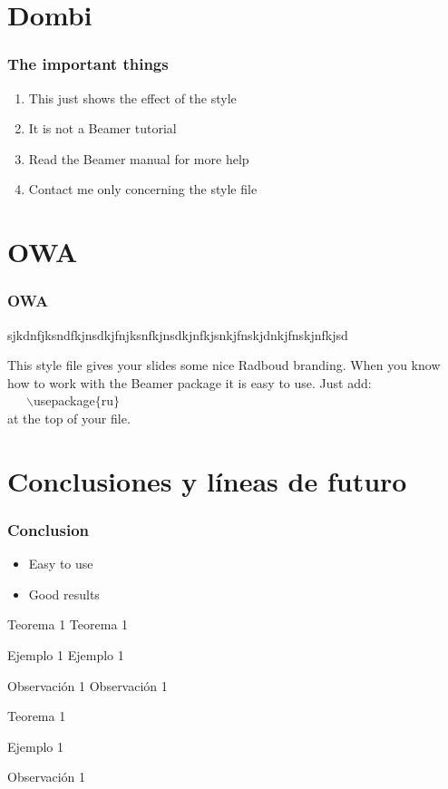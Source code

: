 \documentclass{beamer}
\begin{document}
\section{Dombi}

\begin{frame}
  \frametitle{The important things}

  \begin{enumerate}
    \item This just shows the effect of the style
    \item It is not a Beamer tutorial
    \item Read the Beamer manual for more help
    \item Contact me only concerning the style file
  \end{enumerate}
\end{frame}

\section{OWA}

\begin{frame}
  \frametitle{OWA}

sjkdnfjksndfkjnsdkjfnjksnfkjnsdkjnfkjsnkjfnskjdnkjfnskjnfkjsd

  This style file gives your slides some nice Radboud branding.
  When you know how to work with the Beamer package it is easy to use.
  Just add:\\ ~~~$\backslash$usepackage$\{$ru$\}$ \\ at the top of your file.
\end{frame}

\section{Conclusiones y líneas de futuro}{

\begin{frame}
  \frametitle{Conclusion}

  \begin{itemize}
    \item Easy to use
    \item Good results
  \end{itemize}
\end{frame}
}

\begin{frame}
\begin{block}{Teorema 1} Teorema 1
\end{block}
\begin{exampleblock}{Ejemplo 1} Ejemplo 1
\end{exampleblock}
\begin{alertblock}{Observación 1} Observación 1
\end{alertblock}
\begin{block}{} Teorema 1 \end{block}
\begin{exampleblock}{} Ejemplo 1 \end{exampleblock}
\begin{alertblock}{} Observación 1 \end{alertblock}
\end{frame}

\begin{frame}
  
\end{frame}

\begin{frame}
  \titlepage
\end{frame}
\end{document}
